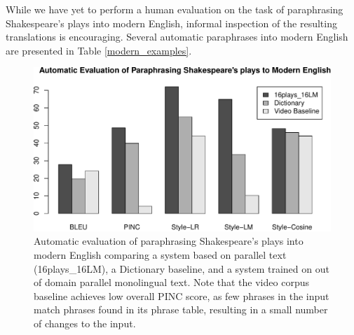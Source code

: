 \documentclass[10pt,a5paper,twoside]{article}
\begin{document}
While we have yet to perform a human evaluation on the task of paraphrasing Shakespeare's plays into modern English, 
informal inspection of the resulting translations is encouraging.  Several automatic paraphrases into modern English are presented in Table \ref{modern_examples}.

\begin{figure}
  \includegraphics[width=5in]{figures/shakespeare_to_modern-crop.pdf}
  \caption{Automatic evaluation of paraphrasing Shakespeare's plays into modern English comparing a system based on parallel text (16plays\_16LM), 
  a Dictionary baseline, and a system trained on out of domain parallel monolingual text.  Note that the video corpus baseline achieves low overall
  PINC score, as few phrases in the input match phrases found in its phrase table, resulting in a small number of changes to the input.}
  \label{shakespeare_to_modern_automatic}
\end{figure}
\end{document}
